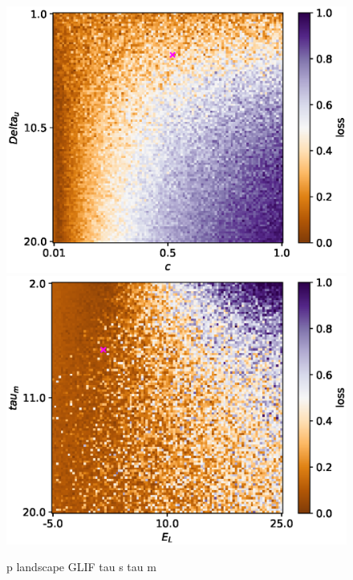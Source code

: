 \documentclass[mphil,deptreport,ianc]{infthesis} %
\begin{document}
\begin{figure}
    \centering
    \vskip -0.1in
    \includegraphics[width=0.9\columnwidth]{figures/param_landscape_heatmaps/microGIF/test_export_2d_heatmap_N_4_loss_c_Delta_u.eps}
    \includegraphics[width=0.9\columnwidth]{figures/param_landscape_heatmaps/microGIF/test_export_2d_heatmap_N_4_loss_E_L_tau_m.eps}
    \vskip -0.1in
    \caption{p landscape GLIF tau s tau m}
    \vskip -0.2in
\end{figure}
\end{document}
